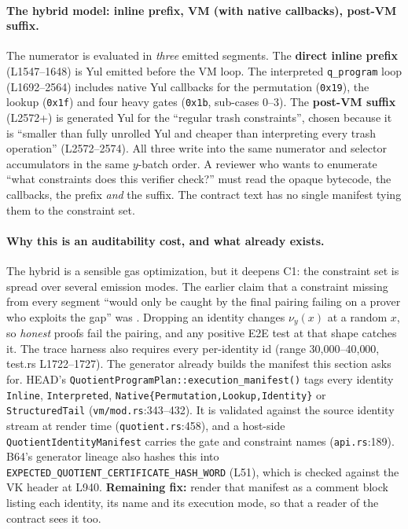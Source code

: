 \paragraph{The hybrid model: inline prefix, VM (with native callbacks), post-VM suffix.}
The numerator is evaluated in \emph{three} emitted segments. The
\textbf{direct inline prefix} (L1547--1648) is Yul emitted before
the VM loop. The interpreted \texttt{q\_program} loop (L1692--2564)
includes native Yul callbacks for the permutation (\texttt{0x19}),
the lookup (\texttt{0x1f}) and four heavy gates (\texttt{0x1b},
sub-cases 0--3). The \textbf{post-VM suffix} (L2572+) is generated
Yul for the ``regular trash constraints'', chosen because it is
``smaller than fully unrolled Yul and cheaper than interpreting
every trash operation'' (L2572--2574). All three write into the
same numerator and selector accumulators in the same $y$-batch
order. A reviewer who wants to enumerate ``what constraints does
this verifier check?'' must read the opaque bytecode, the
callbacks, the prefix \emph{and} the suffix. The contract text has
no single manifest tying them to the constraint set.

\paragraph{Why this is an auditability cost, and what already exists.}
The hybrid is a sensible gas optimization, but it deepens C1: the
constraint set is spread over several emission modes. The earlier
claim that a constraint missing from every segment ``would only be
caught by the final pairing failing on a prover who exploits the
gap'' was . Dropping an identity changes
$\nu_y(x)$ at a random $x$, so \emph{honest} proofs fail the
pairing, and any positive E2E test at that shape catches it. The
trace harness also requires every per-identity id (range
30{,}000--40{,}000, test.rs L1722--1727). The generator already
builds the manifest this section asks for. HEAD's
\texttt{QuotientProgramPlan::execution\_\allowbreak{}manifest()} tags every
identity \texttt{Inline}, \texttt{Interpreted},
\texttt{Native\{Permutation,Lookup,Identity\}} or
\texttt{StructuredTail} (\texttt{vm/mod.rs}:343--432). It is
validated against the source identity stream at render time
(\texttt{quotient.rs}:458), and a host-side
\texttt{QuotientIdentityManifest} carries the gate and constraint
names (\texttt{api.rs}:189). B64's generator lineage also hashes
this into \texttt{EXPECTED\_\allowbreak{}QUOTIENT\_\allowbreak{}CERTIFICATE\_\allowbreak{}HASH\_\allowbreak{}WORD} (L51),
which is checked against the VK header at L940.
\textbf{Remaining fix:} render that manifest as a comment block
listing each identity, its name and its execution mode, so that a
reader of the contract sees it too.

